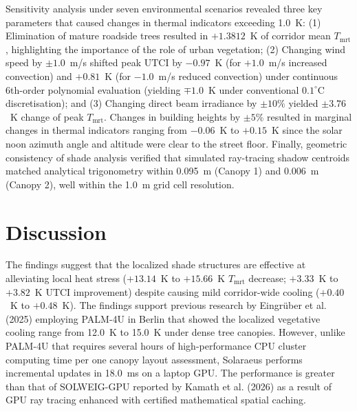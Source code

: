 \documentclass[conference]{IEEEtran}
\newcommand{\Tmrt}{T_{\mathrm{mrt}}}
\newcommand{\UTCI}{\mathrm{UTCI}}
\begin{document}
Sensitivity analysis under seven environmental scenarios revealed three key parameters that caused changes in thermal indicators exceeding 1.0~K: (1) Elimination of mature roadside trees resulted in $+1.3812$~K of corridor mean $\Tmrt$, highlighting the importance of the role of urban vegetation; (2) Changing wind speed by $\pm 1.0$~m/s shifted peak $\UTCI$ by $-0.97$~K (for $+1.0$~m/s increased convection) and $+0.81$~K (for $-1.0$~m/s reduced convection) under continuous 6th-order polynomial evaluation (yielding $\mp 1.0$~K under conventional $0.1^\circ\mathrm{C}$ discretisation); and (3) Changing direct beam irradiance by $\pm 10\%$ yielded $\pm 3.76$~K change of peak $\Tmrt$. Changes in building heights by $\pm 5\%$ resulted in marginal changes in thermal indicators ranging from $-0.06$~K to $+0.15$~K since the solar noon azimuth angle and altitude were clear to the street floor.
Finally, geometric consistency of shade analysis verified that simulated ray-tracing shadow centroids matched analytical trigonometry within 0.095~m (Canopy 1) and 0.006~m (Canopy 2), well within the 1.0~m grid cell resolution.

\section{Discussion}

The findings suggest that the localized shade structures are effective at alleviating local heat stress ($+13.14$~K to $+15.66$~K $\Tmrt$ decrease; $+3.33$~K to $+3.82$~K $\UTCI$ improvement) despite causing mild corridor-wide cooling ($+0.40$~K to $+0.48$~K). The findings support previous research by Eingr{\"u}ber et al. (2025) \cite{eingruber2025simulation} employing PALM-4U in Berlin that showed the localized vegetative cooling range from 12.0~K to 15.0~K under dense tree canopies. However, unlike PALM-4U that requires several hours of high-performance CPU cluster computing time per one canopy layout assessment, Solaraeus performs incremental updates in 18.0~ms on a laptop GPU. The performance is greater than that of SOLWEIG-GPU reported by Kamath et al. (2026) \cite{kamath2026solweig} as a result of GPU ray tracing enhanced with certified mathematical spatial caching.
\end{document}
